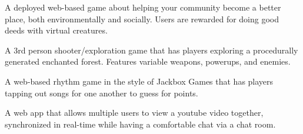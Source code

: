 \documentclass[10pt,a4paper,ragged2e,withhyper]{altacv}
\begin{document}
\begin{paracol}{2}
\divider{}

\small{}A deployed web-based game about helping your community become a better place, both environmentally and socially.
Users are rewarded for doing good deeds with virtual creatures.

\divider{}

\small{}A 3rd person shooter/exploration game that has players exploring a procedurally generated enchanted forest.
Features variable weapons, powerups, and enemies.

\divider{}

\small{}A web-based rhythm game in the style of Jackbox Games that has players tapping out songs for one another to guess for points.

\divider{}

\small{}A web app that allows multiple users to view a youtube video together, synchronized in real-time while having a comfortable chat via a chat room.

\divider{}

\medskip




\switchcolumn{}

\divider{}

\divider{}

\divider{}

\divider{}

\divider{}

\divider{}

\divider{}

\divider{}



\divider{}

\divider{}


\end{paracol}
\end{document}
